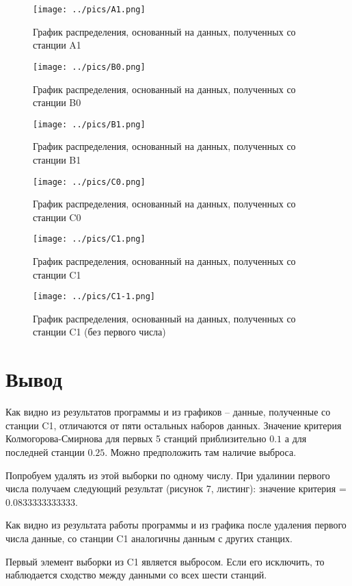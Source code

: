     \begin{figure}[ht!]
        \centering
        \texttt{[image: ../pics/A1.png]}
        \caption{График распределения, основанный на данных, полученных со станции A1}
    \end{figure}

    \begin{figure}[ht!]
        \centering
        \texttt{[image: ../pics/B0.png]}
        \caption{График распределения, основанный на данных, полученных со станции B0}
    \end{figure}

    \begin{figure}[ht!]
        \centering
        \texttt{[image: ../pics/B1.png]}
        \caption{График распределения, основанный на данных, полученных со станции B1}
    \end{figure}

    \begin{figure}[ht!]
        \centering
        \texttt{[image: ../pics/C0.png]}
        \caption{График распределения, основанный на данных, полученных со станции C0}
    \end{figure}

    \begin{figure}[ht!]
        \centering
        \texttt{[image: ../pics/C1.png]}
        \caption{График распределения, основанный на данных, полученных со станции C1}
    \end{figure}
    \begin{figure}\end{figure}

    \begin{figure}[ht!]
        \centering
        \texttt{[image: ../pics/C1-1.png]}
        \caption{График распределения, основанный на данных, полученных со станции C1 (без первого числа)}
    \end{figure}

\clearpage
\section{Вывод}

    Как видно из результатов программы и из графиков -- данные, полученные со станции C1, отличаются от пяти остальных наборов данных.
    Значение критерия Колмогорова-Смирнова для первых 5 станций приблизительно $0.1$ а для последней станции $0.25$.
    Можно предположить там наличие выброса.

    Попробуем удалять из этой выборки по одному числу.
    При удалинии первого числа получаем следующий результат (рисунок 7, листинг): значение критерия = $0.0833333333333$.

    Как видно из результата работы программы и из графика после удаления первого числа данные, со станции C1 аналогичны данным с других станцих.

    Первый элемент выборки из C1 является выбросом.
    Если его исключить, то наблюдается сходство между данными со всех шести станций.